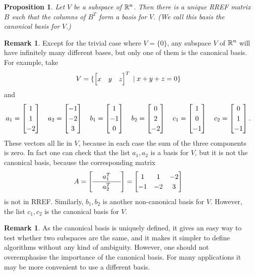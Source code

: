\documentclass[reqno]{amsart}
\newtheorem{proposition}[theorem]{Proposition}
\theoremstyle{definition}
\newtheorem{remark}[theorem]{Remark}
\newcommand{\dfn}[1]{\emph{{#1}}\index{#1}}
\begin{document}
\begin{proposition}\label{prop-canonical-basis}
 Let $V$ be a subspace of ${\mathbb{R}}^n$.  Then there is a unique RREF
 matrix $B$ such that the columns of $B^T$ form a basis for $V$.  (We
 call this basis the \dfn{canonical basis} for $V$.)
\end{proposition}

\begin{remark}
 Except for the trivial case where $V=\{0\}$, any subspace $V$ of
 ${\mathbb{R}}^n$ will have infinitely many different bases, but only one of
 them is the canonical basis.  For example, take
 \[ V = \{\bbm x&y&z\ebm^T \st x+y+z=0\} \]
 and
 \[ a_1 = \bbm 1\\1\\-2 \ebm \quad
    a_2 = \bbm -1\\-2\\3\ebm \quad
    b_1 = \bbm 1\\-1\\0 \ebm \quad
    b_2 = \bbm 0\\2\\-2 \ebm \quad
    c_1 = \bbm 1\\0\\-1 \ebm \quad
    c_2 = \bbm 0\\1\\-1 \ebm.
 \] 
 These vectors all lie in $V$, because in each case the sum of the
 three components is zero.  In fact one can check that the list 
 $a_1,a_2$ is a basis for $V$, but it is not the canonical basis,
 because the corresponding matrix 
 \[ A={ \renewcommand{\arraystretch}{1.2}
      \left[\begin{array}{ccc}
       & a_1^T & \\ \hline
       & a_2^T &
      \end{array}\right]} = 
   \bbm 1 & 1 & -2 \\ -1 & -2 & 3 \ebm
 \]
 is not in RREF.  Similarly, $b_1,b_2$ is another non-canonical
 basis for $V$.  However, the list $c_1,c_2$ is the canonical basis
 for $V$.  
\end{remark}

\begin{remark}
 As the canonical basis is uniquely defined, it gives an easy way to
 test whether two subspaces are the same, and it makes it simpler to
 define algorithms without any kind of ambiguity.  However, one should
 not overemphasise the importance of the canonical basis.  For many
 applications it may be more convenient to use a different basis.
\end{remark}
\end{document}
